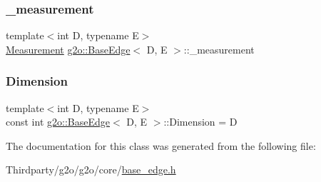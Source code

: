\mbox{\label{classg2o_1_1_base_edge_af2a6ab1df6e91601b4cab23e0e99e034}} 
\subsubsection{\texorpdfstring{\+\_\+measurement}{\_measurement}}
{\footnotesize\ttfamily template$<$int D, typename E$>$ \\
\mbox{\hyperlink{classg2o_1_1_base_edge_a2c148abba650a20b8c7eed75d3e2211e}{Measurement}} \mbox{\hyperlink{classg2o_1_1_base_edge}{g2o\+::\+Base\+Edge}}$<$ D, E $>$\+::\+\_\+measurement\hspace{0.3cm}{\ttfamily [protected]}}

\mbox{\label{classg2o_1_1_base_edge_ab4812acb21e0b9de80dc6d676e71cb70}} 
\subsubsection{\texorpdfstring{Dimension}{Dimension}}
{\footnotesize\ttfamily template$<$int D, typename E$>$ \\
const int \mbox{\hyperlink{classg2o_1_1_base_edge}{g2o\+::\+Base\+Edge}}$<$ D, E $>$\+::Dimension = D\hspace{0.3cm}{\ttfamily [static]}}



The documentation for this class was generated from the following file\+:\begin{DoxyCompactItemize}
\item 
Thirdparty/g2o/g2o/core/\mbox{\hyperlink{base__edge_8h}{base\+\_\+edge.\+h}}\end{DoxyCompactItemize}
